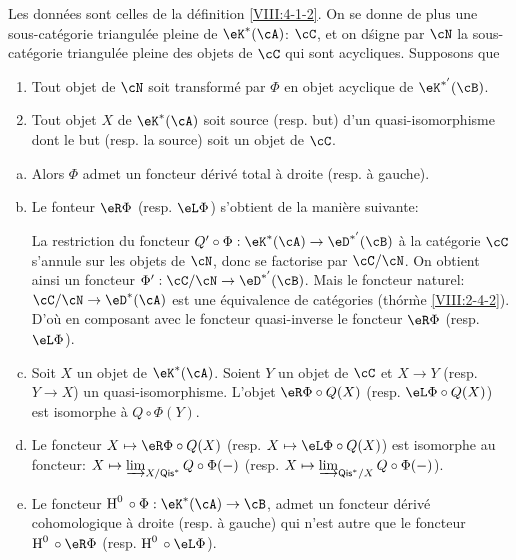 \begin{theorem}\label{VIII:4-2-3} %
Les données sont celles de la définition \ref{VIII:4-1-2}. On se donne de 
plus une sous-catégorie triangulée pleine de $\eK^\ast(\cA)$: $\cC$, et on 
d\'signe par $\cN$ la sous-catégorie triangulée pleine des objets de $\cC$ 
qui sont acycliques. Supposons que 
\begin{enumerate}[(1)]
  \item Tout objet de $\cN$ soit transformé par $\Phi$ en objet acyclique 
    de $\eK^{\ast'}(\cB)$. 
  \item Tout objet $X$ de $\eK^\ast(\cA)$ soit source (resp. but) d'un 
    quasi-isomorphisme dont le but (resp. la source) soit un objet de $\cC$. 
\end{enumerate}
\begin{enumerate}[a)]
  \item Alors $\Phi$ admet un foncteur dérivé total à droite (resp. 
    à gauche). 
  \item Le fonteur $\eR \Phi$ (resp. $\eL \Phi$) s'obtient de la manière 
    suivante: 
    
    La restriction du foncteur 
    $Q'\circ \Phi:\eK^\ast(\cA) \to \eD^{\ast'}(\cB)$ à la catégorie $\cC$ 
    s'annule sur les objets de $\cN$, donc se factorise par $\cC/\cN$. On 
    obtient ainsi un foncteur $\Phi':\cC/\cN\to \eD^{\ast'}(\cB)$. Mais le 
    foncteur naturel: $\cC/\cN\to \eD^\ast(\cA)$ est une équivalence de 
    catégories (th\'or\`me \ref{VIII:2-4-2}). D'où en composant avec le 
    foncteur quasi-inverse le foncteur $\eR\Phi$ (resp. $\eL \Phi$). 
  \item Soit $X$ un objet de $\eK^\ast(\cA)$. Soient $Y$ un objet de $\cC$ et 
    $X\to Y$ (resp. $Y\to X$) un quasi-isomorphisme. L'objet 
    $\eR\Phi\circ Q(X)$ (resp. $\eL \Phi\circ Q(X)$) est isomorphe à 
    $Q\circ \Phi(Y)$. 
  \item Le foncteur $X\mapsto \eR\Phi\circ Q(X)$ (resp. 
    $X\mapsto \eL \Phi\circ Q(X)$) est isomorphe au foncteur: 
    $X\mapsto \varinjlim_{X/\mathsf{Qis}^\ast} Q\circ\Phi(-)$ (resp. 
    $X\mapsto \varinjlim_{\mathsf{Qis}^\ast/X} Q\circ \Phi(-)$). 
  \item Le foncteur $\h^0{}\circ \Phi:\eK^\ast(\cA)\to \cB$, admet un 
    foncteur dérivé cohomologique à droite (resp. à gauche) qui n'est 
    autre que le foncteur $\h^0{}\circ\eR\Phi$ (resp. $\h^0{}\circ \eL\Phi$). 
\end{enumerate}
\end{theorem}





